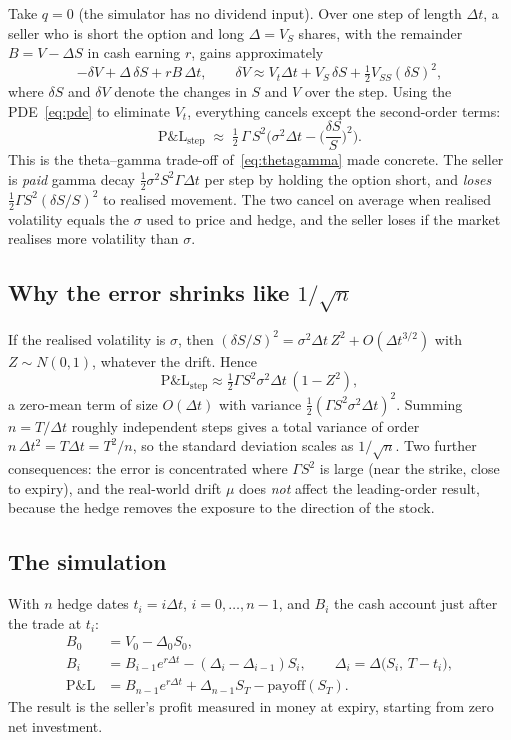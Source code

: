 \documentclass[11pt,a4paper]{article}
\theoremstyle{plain}
\theoremstyle{remark}
\begin{document}
Take $q=0$ (the simulator has no dividend input). Over one step of length $\Delta t$, a seller who is short the option and long $\Delta=V_S$
shares, with the remainder $B=V-\Delta S$ in cash earning $r$, gains approximately
\[
-\delta V+\Delta\,\delta S+rB\,\Delta t,\qquad \delta V\approx V_t\Delta t+V_S\,\delta S+\tfrac12V_{SS}(\delta S)^2 ,
\]
where $\delta S$ and $\delta V$ denote the changes in $S$ and $V$ over the step.
Using the PDE~\eqref{eq:pde} to eliminate $V_t$, everything cancels except the second-order terms:
\begin{equation}\label{eq:hedgeerr}
\text{P\&L}_{\text{step}}\;\approx\;\tfrac12\,\Gamma\,S^2\Big(\sigma^2\Delta t-\Big(\frac{\delta S}{S}\Big)^2\Big).
\end{equation}
This is the theta--gamma trade-off of~\eqref{eq:thetagamma} made concrete. The seller is \emph{paid} gamma decay $\tfrac12\sigma^2S^2\Gamma\Delta t$
per step by holding the option short, and \emph{loses} $\tfrac12\Gamma S^2(\delta S/S)^2$ to realised movement. The two cancel
on average when realised volatility equals the $\sigma$ used to price and hedge, and the seller loses if the market realises more volatility than $\sigma$.

\subsection{Why the error shrinks like $1/\sqrt n$}

If the realised volatility is $\sigma$, then $(\delta S/S)^2=\sigma^2\Delta t\,Z^2+O(\Delta t^{3/2})$ with $Z\sim N(0,1)$, whatever the drift. Hence
\[
\text{P\&L}_{\text{step}}\approx\tfrac12\Gamma S^2\sigma^2\Delta t\,(1-Z^2),
\]
a zero-mean term of size $O(\Delta t)$ with variance $\tfrac12(\Gamma S^2\sigma^2\Delta t)^2$. Summing $n=T/\Delta t$ roughly independent
steps gives a total variance of order $n\,\Delta t^2=T\Delta t=T^2/n$, so the standard deviation scales as $1/\sqrt n$.
Two further consequences: the error is concentrated where $\Gamma S^2$ is large (near the strike, close to expiry), and the real-world drift $\mu$ does \emph{not}
affect the leading-order result, because the hedge removes the exposure to the direction of the stock.

\subsection{The simulation}

With $n$ hedge dates $t_i=i\Delta t$, $i=0,\dots,n-1$, and $B_i$ the cash account just after the trade at $t_i$:
\begin{align*}
B_0&=V_0-\Delta_0S_0,\\
B_i&=B_{i-1}e^{r\Delta t}-(\Delta_i-\Delta_{i-1})S_i,\qquad \Delta_i=\Delta\big(S_i,\,T-t_i\big),\\
\text{P\&L}&=B_{n-1}e^{r\Delta t}+\Delta_{n-1}S_T-\text{payoff}(S_T).
\end{align*}
The result is the seller's profit measured in money at expiry, starting from zero net investment.
\end{document}
